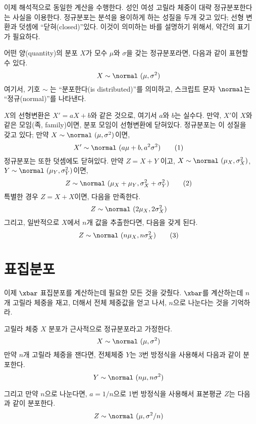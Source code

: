 이제 해석적으로 동일한 계산을 수행한다. 성인 여성 고릴라 체중이 대략 정규분포한다는 사실을 이용한다.
정규분포는 분석을 용이하게 하는 성질을 두개 갖고 있다; 선형 변환과 덧셈에 ``닫혀(closed)''있다.
이것이 의미하는 바를 설명하기 위해서, 약간의 표기가 필요하다. 

어떤 양(quantity)의 분포 $X$가 모수 $\mu$와 $\sigma$을 갖는 정규분포라면, 다음과 같이 표현할 수 있다.
%
\[ X \sim \normal~(\mu, \sigma^{2})\]
%
여기서, 기호 $\sim$ 는 ``분포한다(is distributed)''를 의미하고, 스크립트 문자 $\normal$는 ``정규(normal)''를 나타낸다.

$X$의 선형변환은 $X' = a X + b$와 같은 것으로, 여기서 $a$와 $b$는 실수다.
만약, $X'$이 $X$와 같은 모임(족, family)이면, 분포 모임이 선형변환에 닫혀있다. 정규분포는 이 성질을 갖고 있다; 만약 $X \sim \normal~(\mu,
\sigma^2)$이면,
%
\[ X' \sim \normal~(a \mu + b, a^{2} \sigma^2) \tag*{(1)} \]
%
정규분포는 또한 덧셈에도 닫혀있다.
만약 $Z = X + Y$ 이고, $X \sim \normal~(\mu_{X}, \sigma_{X}^{2})$, $Y \sim \normal~(\mu_{Y}, \sigma_{Y}^{2})$이면,
%
\[ Z \sim \normal~(\mu_X + \mu_Y, \sigma_X^2 + \sigma_Y^2)  \tag*{(2)}\]
%
특별한 경우 $Z = X + X$이면, 다음을 만족한다.
%
\[ Z \sim \normal~(2 \mu_X, 2 \sigma_X^2) \]
%
그리고, 일반적으로 $X$에서 $n$개 값을 추출한다면, 다음을 갖게 된다.
%
\[ Z \sim \normal~(n \mu_X, n \sigma_X^2)  \tag*{(3)}\]


\section{표집분포}

이제 $\xbar$ 표집분포를 계산하는데 필요한 모든 것을 갖췄다. $\xbar$를 계산하는데 $n$개 고릴라 체중을 재고, 더해서 전체 체중값을 얻고 나서, $n$으로 나눈다는 것을 기억하라.

고릴라 체중 $X$ 분포가 근사적으로 정규분포라고 가정한다.
%
\[ X \sim \normal~(\mu, \sigma^2)\]
%
만약 $n$개 고릴라 체중을 잰다면, 전체체중 $Y$는 3번 방정식을 사용해서 다음과 같이 분포한다.
%
\[ Y \sim \normal~(n \mu, n \sigma^2) \]
%

그리고 만약 $n$으로 나눈다면, $a = 1/n$으로 1번 방정식을 사용해서 표본평균 $Z$는 다음과 같이 분포한다.
%
\[ Z \sim \normal~(\mu, \sigma^2/n) \]
%

